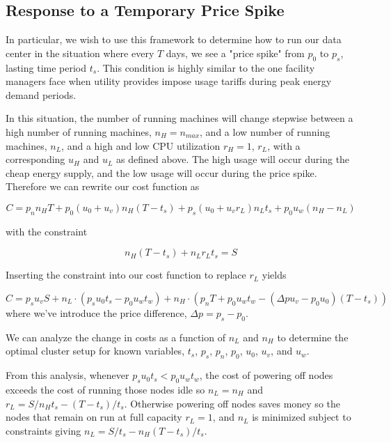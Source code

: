 \subsection{Response to a Temporary Price Spike}

In particular, we wish to use this framework to determine how to run our data center in the situation where every $T$ days, we see a "price spike" from $p_0$ to $p_s$, lasting time period $t_s$.  This condition is highly similar to the one facility managers face when utility provides impose usage tariffs during peak energy demand periods.

In this situation, the number of running machines will change stepwise between a high number of running machines, $n_H=n_{max}$, and a low number of running machines, $n_L$, and a high and low CPU utilization $r_H=1$, $r_L$, with a corresponding $u_H$ and $u_L$ as defined above.  The high usage will occur during the cheap energy supply, and the low usage will occur during the price spike.  Therefore we can rewrite our cost function as 

\begin{equation}
	C = p_n n_H T + p_0 (u_0 + u_v) n_H (T-t_s) + p_s (u_0 + u_v r_L) n_L t_s + p_0 u_w (n_H-n_L)
\end{equation}

with the constraint

\begin{equation}
n_H (T-t_s) + n_L r_L t_s = S
\end{equation}

Inserting the constraint into our cost function to replace $r_L$ yields 

\begin{equation}
C = p_s u_v S + n_L \cdot( p_s u_0 t_s - p_0 u_w t_w) + n_H \cdot (p_n T + p_0 u_w t_w -(\Delta p u_v - p_0 u_0)(T-t_s))
\end{equation}
where we've introduce the price difference, $\Delta p = p_s - p_0$.

We can analyze the change in costs as a function of $n_L$ and $n_H$ to determine the optimal cluster setup for known variables, $t_s$, $p_s$, $p_n$, $p_0$, $u_0$, $u_v$, and $u_w$. 

From this analysis, whenever $ p_s u_0 t_s < p_0 u_w t_w$, the cost of powering off nodes exceeds the cost of running those nodes idle so $n_L = n_H$ and $r_L = S/n_H t_s - (T-t_s)/t_s$. Otherwise powering off nodes saves money so the nodes that remain on run at full capacity $r_L = 1$, and $n_L$ is minimized subject to constraints giving $n_L = S/t_s - n_H(T-t_s)/t_s$.

